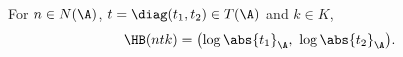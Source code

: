 For $n\in N(\A)$, $t=\diag(t_1,t_2)\in T(\A)$ and $k\in K$,
\[
  \HB(ntk)=\bigl(\log\abs{t_1}_\A,\ \log\abs{t_2}_\A\bigr).
\]
